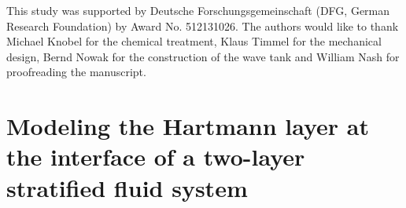 \documentclass[aps,prfluids,reprint,superscriptaddress]{revtex4-2}
\begin{document}
\begin{acknowledgments}
	This study was supported by Deutsche Forschungsgemeinschaft (DFG, German Research Foundation) by Award No. 512131026. The authors would like to thank Michael Knobel for the chemical treatment, Klaus Timmel for the mechanical design, Bernd Nowak for the construction of the wave tank and William Nash for proofreading the manuscript.
\end{acknowledgments}





\appendix*
\section{Modeling the Hartmann layer at the interface of a two-layer stratified fluid system}
\label{app}
\end{document}
